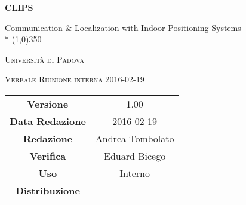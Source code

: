 \documentclass[a4paper,12pt]{article}
\author{Davide Castello}
\date{05/01/2013}
\begin{document}
\begin{titlepage}
	\centering
	{\huge\bfseries CLIPS\par}
	Communication \& Localization with Indoor Positioning Systems \\*
	\line(1,0){350} \\
	{\scshape\LARGE Università di Padova \par}
	\vspace{1cm}
	{\scshape\Large Verbale Riunione interna 2016-02-19 \par}
	\logo
	\newpage
	\begin{tabular}{c|c}
		{\hfill \textbf{Versione}} 			& 1.00				\\
		{\hfill\textbf{Data Redazione}} 	& 2016-02-19  		\\
		{\hfill\textbf{Redazione}} 			& Andrea Tombolato	\\
		{\hfill\textbf{Verifica}} 			& Eduard Bicego		\\
		{\hfill\textbf{Uso}} 				& Interno			\\
		{\hfill\textbf{Distribuzione}} 		& \leaf\			\\
	\end{tabular}
\end{titlepage}
	
	\newpage

	
	\label{LastFrontPage}
	

	\newpage
	
	\pagestyle{mymain}
	
	
		

	
		
	
	
		
	
	
		
				
	\label{LastPage}
\end{document}
